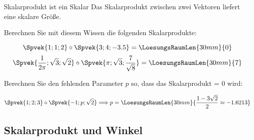 \begin{gesetz}{Skalarprodukt ist ein Skalar}{}
  Das Skalarprodukt zwischen zwei Vektoren liefert eine skalare Größe.
\end{gesetz}

Berechnen Sie mit diesem Wissen die folgenden Skalarprodukte:

\vspace{3mm}


$$\Spvek{1;1;2} \circ \Spvek{3;4;-3.5} = \LoesungsRaumLen{30mm}{0}$$
$$\Spvek{\frac1{2\pi};\sqrt{3};\sqrt{2}} \circ \Spvek{\pi;
  \sqrt{3};\frac{7}{\sqrt{8}}} = \LoesungsRaumLen{30mm}{7}$$

Berechnen Sie den fehlenden Parameter $p$ so, dass das Skalarprodukt = 0 wird:
\vspace{3mm}

$$\Spvek{1;2;3}\circ{}\Spvek{-1;p;\sqrt{2}} \Longrightarrow p =
\LoesungsRaumLen{30mm}{\frac{1-3\sqrt{2}}{2} \approx -1.6213}$$


\newpage


\subsection{Skalarprodukt und Winkel}


